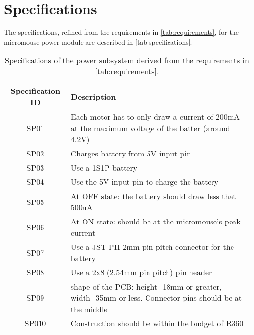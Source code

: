 \documentclass[class=report,11pt,crop=false]{standalone}
\begin{document}
\section{Specifications}
The specifications, refined from the requirements in \autoref{tab:requirements}, for the micromouse power module are described in \autoref{tab:specifications}.
\begin{table}[h]
    \centering
    \caption{Specifications of the power subsystem derived from the requirements in \autoref{tab:requirements}.}    \label{tab:specifications}
    \begin{tabular}{|c|m{12cm}|}
        \hline
        \textbf{Specification ID} & \textbf{Description} \\
        \hline
         SP01 & Each motor has to only draw a current of 200mA at the maximum voltage of the batter (around 4.2V) \\
         \hline
         SP02 & Charges battery from 5V input pin \\
         \hline
         SP03 & Use a 1S1P battery \\
         \hline
         SP04 & Use the 5V input pin to charge the battery\\
         \hline
         SP05 & At OFF state: the battery should draw less that 500uA \\
         \hline
         SP06 & At ON state: should be at the micromouse's peak current \\
         \hline
         SP07 & Use a JST PH 2mm pin pitch connector for the battery \\
         \hline
         SP08 & Use a 2x8 (2.54mm pin pitch) pin header \\
         \hline
         SP09 & shape of the PCB: height- 18mm or greater, width- 35mm or less. Connector pins should be at the middle \\
         \hline
         SP010 & Construction should be within the budget of R360 \\
         \hline
    \end{tabular}
\end{table}

\end{document}
